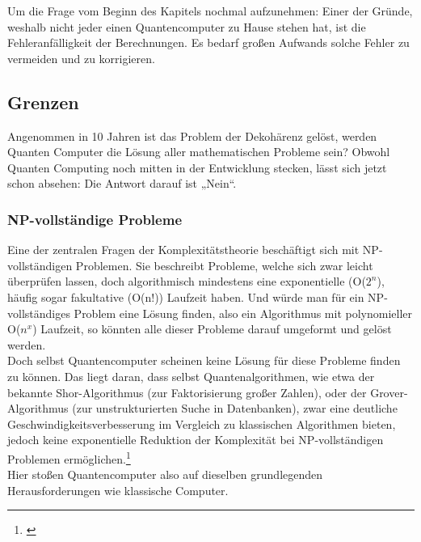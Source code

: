 Um die Frage vom Beginn des Kapitels nochmal aufzunehmen: Einer der Gründe, weshalb nicht jeder einen Quantencomputer zu Hause stehen hat, ist die Fehleranfälligkeit der Berechnungen.
Es bedarf großen Aufwands solche Fehler zu vermeiden und zu korrigieren.\\


\subsection{Grenzen}
\label{subsec:grenzen}

Angenommen in 10 Jahren ist das Problem der Dekohärenz gelöst, werden Quanten Computer die Lösung aller mathematischen Probleme sein?
Obwohl Quanten Computing noch mitten in der Entwicklung stecken, lässt sich jetzt schon absehen: Die Antwort darauf ist „Nein“.\\

\subsubsection{NP-vollständige Probleme}
\label{subsubsec:np-vollstaendige-probleme}
Eine der zentralen Fragen der Komplexitätstheorie beschäftigt sich mit NP-vollständigen Problemen.
Sie beschreibt Probleme, welche sich zwar leicht überprüfen lassen, doch algorithmisch mindestens eine exponentielle (O($2^{n}$), häufig sogar fakultative (O(n!)) Laufzeit haben.
Und würde man für ein NP-vollständiges Problem eine Lösung finden, also ein Algorithmus mit polynomieller O($n^{x}$) Laufzeit, so könnten alle dieser Probleme darauf umgeformt und gelöst werden.\\

Doch selbst Quantencomputer scheinen keine Lösung für diese Probleme finden zu können.
Das liegt daran, dass selbst Quantenalgorithmen, wie etwa der bekannte Shor-Algorithmus (zur Faktorisierung großer Zahlen),
oder der Grover-Algorithmus (zur unstrukturierten Suche in Datenbanken), zwar eine deutliche Geschwindigkeitsverbesserung im Vergleich zu klassischen Algorithmen bieten,
jedoch keine exponentielle Reduktion der Komplexität bei NP-vollständigen Problemen ermöglichen.\footnote{\cite[S. 165]{homeister_quantum_2022}}\\
Hier stoßen Quantencomputer also auf dieselben grundlegenden Herausforderungen wie klassische Computer.\\

